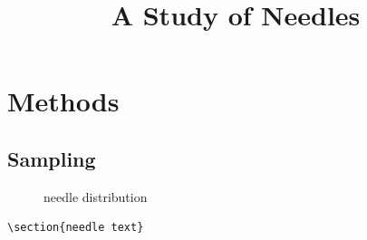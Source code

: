 \title{A Study of Needles}

\section{Methods}
\subsection[Short]{Sampling}
\begin{figure}
\caption{needle distribution}
\end{figure}
\begin{verbatim}
\section{needle text}
\end{verbatim}

